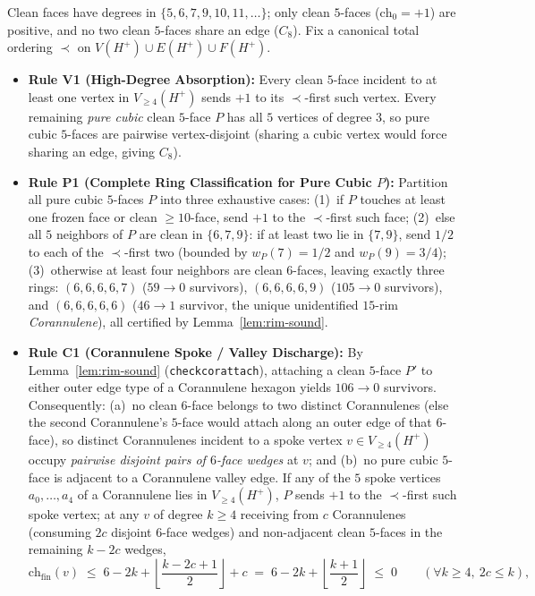 \documentclass[11pt,reqno]{amsart}
\theoremstyle{plain}
\theoremstyle{definition}
\theoremstyle{remark}
\newcommand{\chz}{\mathrm{ch}_0}
\newcommand{\chf}{\mathrm{ch}_{\mathrm{fin}}}
\newcommand{\Vge}{V_{\ge 4}}
\DeclareRobustCommand{\_}{\ifmmode\text{\textunderscore}\else\textunderscore\allowbreak\fi}
\begin{document}
Clean faces have degrees in $\{5, 6, 7, 9, 10, 11, \dots\}$; only clean $5$-faces ($\chz = +1$) are positive, and no two clean $5$-faces share an edge ($C_8$). Fix a canonical total ordering $\prec$ on $V(H^+) \cup E(H^+) \cup F(H^+)$.
\begin{itemize}[leftmargin=1.8em]
  \item \textbf{Rule V1 (High-Degree Absorption):} Every clean $5$-face incident to at least one vertex in $\Vge(H^+)$ sends $+1$ to its $\prec$-first such vertex. Every remaining \emph{pure cubic} clean $5$-face $P$ has all $5$ vertices of degree $3$, so pure cubic $5$-faces are pairwise vertex-disjoint (sharing a cubic vertex would force sharing an edge, giving $C_8$).
  \item \textbf{Rule P1 (Complete Ring Classification for Pure Cubic $P$):} Partition all pure cubic $5$-faces $P$ into three exhaustive cases: (1)~if $P$ touches at least one frozen face or clean $\ge 10$-face, send $+1$ to the $\prec$-first such face; (2)~else all $5$ neighbors of $P$ are clean in $\{6, 7, 9\}$: if at least two lie in $\{7, 9\}$, send $1/2$ to each of the $\prec$-first two (bounded by $w_P(7) = 1/2$ and $w_P(9) = 3/4$); (3)~otherwise at least four neighbors are clean $6$-faces, leaving exactly three rings: $(6,6,6,6,7)$ ($59 \to 0$ survivors), $(6,6,6,6,9)$ ($105 \to 0$ survivors), and $(6,6,6,6,6)$ ($46 \to 1$ survivor, the unique unidentified $15$-rim \emph{Corannulene}), all certified by Lemma~\ref{lem:rim-sound}.
  \item \textbf{Rule C1 (Corannulene Spoke / Valley Discharge):} By Lemma~\ref{lem:rim-sound} (\texttt{check\_cor\_attach}), attaching a clean $5$-face $P'$ to either outer edge type of a Corannulene hexagon yields $106 \to 0$ survivors. Consequently: (a)~no clean $6$-face belongs to two distinct Corannulenes (else the second Corannulene's $5$-face would attach along an outer edge of that $6$-face), so distinct Corannulenes incident to a spoke vertex $v \in \Vge(H^+)$ occupy \emph{pairwise disjoint pairs of $6$-face wedges} at $v$; and (b)~no pure cubic $5$-face is adjacent to a Corannulene valley edge. If any of the $5$ spoke vertices $a_0,\dots,a_4$ of a Corannulene lies in $\Vge(H^+)$, $P$ sends $+1$ to the $\prec$-first such spoke vertex; at any $v$ of degree $k \ge 4$ receiving from $c$ Corannulenes (consuming $2c$ disjoint $6$-face wedges) and non-adjacent clean $5$-faces in the remaining $k - 2c$ wedges,
  \[
    \chf(v) \;\le\; 6 - 2k + \left\lfloor \frac{k - 2c + 1}{2} \right\rfloor + c \;=\; 6 - 2k + \left\lfloor \frac{k + 1}{2} \right\rfloor \;\le\; 0 \qquad (\forall k \ge 4,\ 2c \le k),
\]
\end{itemize}
\end{document}

